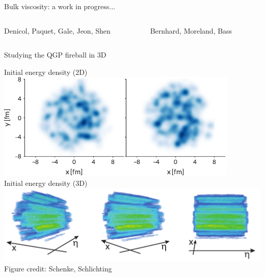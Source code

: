 \documentclass{beamer}
\begin{document}
\begin{frame}{Bulk viscosity: a work in progress...}{}
  \begin{columns}[b]
    \begin{column}{.38\textwidth}
      \centering \scriptsize Denicol, Paquet, Gale, Jeon, Shen
    \end{column}
    \begin{column}{.62\textwidth}
      \centering \scriptsize Bernhard, Moreland, Bass
    \end{column}
  \end{columns}
\end{frame}


\begin{frame}{Studying the QGP fireball in 3D}
  \begin{center}
    Initial energy density (2D)\\[.5ex]
    \includegraphics[width=.6\textwidth]{trento2d}\\[1ex]
    Initial energy density (3D)\\[.5ex]
    \includegraphics[width=.8\textwidth]{three_dim}\\
    {\tiny Figure credit: Schenke, Schlichting}
  \end{center}
\end{frame}
\end{document}
